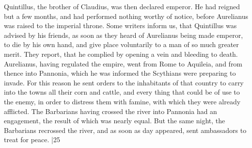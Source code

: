 Quintillus, the brother of Claudius, was then declared emperor. He had reigned but a few months, and had performed nothing worthy of notice, before Aurelianus was raised to the imperial throne. Some writers inform us, that Quintillus was advised by his friends, as soon as they heard of Aurelianus being made emperor, to die by his own hand, and give place voluntarily to a man of so much greater merit. They report, that he complied by opening a vein and bleeding to death. Aurelianus, having regulated the empire, went from Rome to Aquileia, and from thence into Pannonia, which he was informed the Scythians were preparing to invade. For this reason he sent orders to the inhabitants of that country to carry into the towns all their corn and cattle, and every thing that could be of use to the enemy, in order to distress them with famine, with which they were already afflicted. The Barbarians having crossed the river into Pannonia had an engagement, the result of which was nearly equal. But the same night, the Barbarians recrossed the river, and as soon as day appeared, sent ambassadors to treat for peace.
|25

